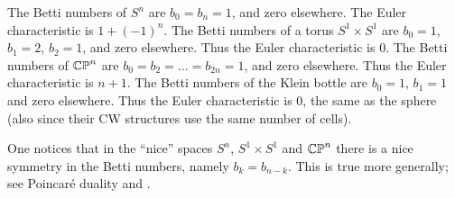 \begin{example}
	\listhack
	\begin{enumerate}[(a)]
		\ii The Betti numbers of $S^n$ are $b_0 = b_n = 1$,
		and zero elsewhere. The Euler characteristic is $1 + (-1)^n$.
		\ii The Betti numbers of a torus $S^1 \times S^1$
		are $b_0 = 1$, $b_1 = 2$, $b_2 = 1$, and zero elsewhere.
		Thus the Euler characteristic is $0$.
		\ii The Betti numbers of $\mathbb{CP}^n$ are $b_0 = b_2 = \dots = b_{2n} = 1$,
		and zero elsewhere. Thus the Euler characteristic is $n+1$.
		\ii The Betti numbers of the Klein bottle
		are $b_0 = 1$, $b_1 = 1$ and zero elsewhere. 
		Thus the Euler characteristic is $0$, the same as the sphere
		(also since their CW structures use the same number of cells).
	\end{enumerate}
	One notices that in the ``nice'' spaces $S^n$, $S^1 \times S^1$ and $\mathbb{CP}^n$
	there is a nice symmetry in the Betti numbers, namely $b_k = b_{n-k}$.
	This is true more generally; see Poincar\'e duality and .
\end{example}

